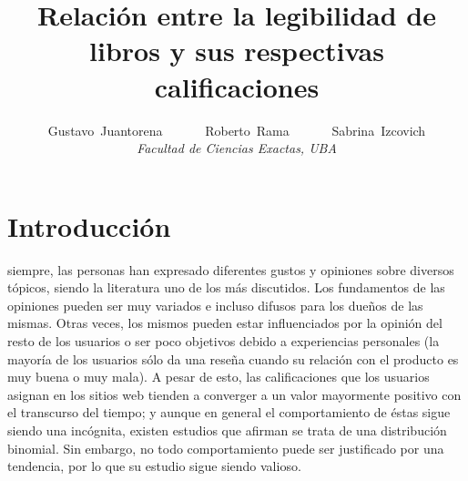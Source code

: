 \documentclass[12pt,journal,compsoc]{IEEEtran}
\begin{document}
\title{Relación entre la legibilidad de libros y sus respectivas calificaciones}

\author{Gustavo~Juantorena~~~~~~
        Roberto~Rama~~~~~~
        Sabrina~Izcovich\\
        \textit{Facultad de Ciencias Exactas, UBA}}



\maketitle
\IEEEdisplaynontitleabstractindextext
\IEEEpeerreviewmaketitle

\section{Introducción}
 siempre, las personas han expresado diferentes gustos y opiniones sobre diversos tópicos, siendo la literatura uno de los más discutidos. Los fundamentos de las opiniones pueden ser muy variados e incluso difusos para los dueños de las mismas. Otras veces, los mismos pueden estar influenciados por la opinión del resto de los usuarios\cite{muchnik} o ser poco objetivos debido a experiencias personales (la mayoría de los usuarios sólo da una reseña cuando su relación con el producto es muy buena o muy mala\cite{hu}). A pesar de esto, las calificaciones que los usuarios asignan en los sitios web tienden a converger a un valor mayormente positivo con el transcurso del tiempo\cite{zhang}; y aunque en general el comportamiento de éstas sigue siendo una incógnita, existen estudios que afirman se trata de una distribución binomial\cite{hu}. Sin embargo, no todo comportamiento puede ser justificado por una tendencia\cite{zhang}, por lo que su estudio sigue siendo valioso.
\end{document}
